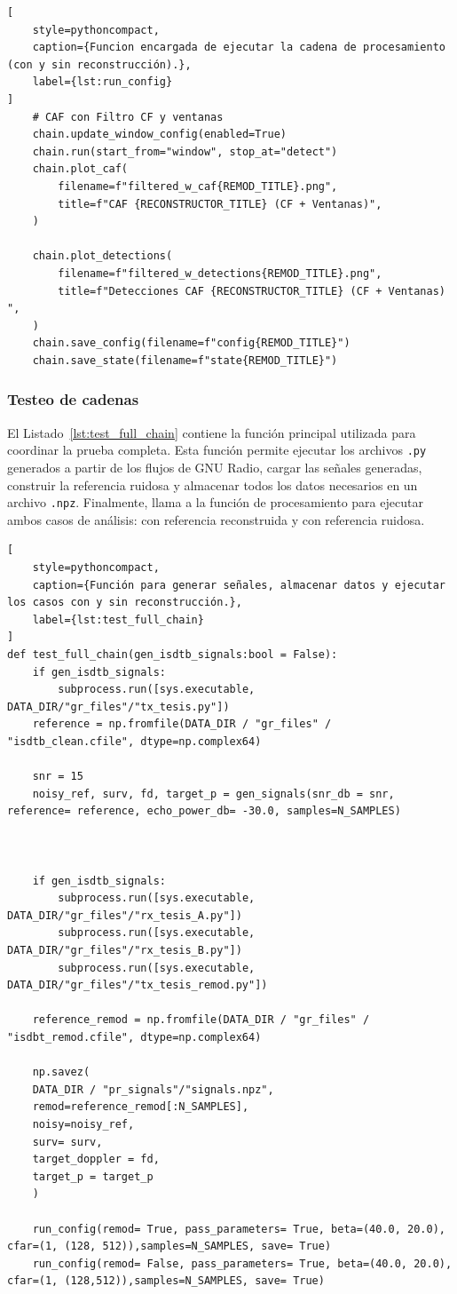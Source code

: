 \begin{lstlisting}[
    style=pythoncompact,
    caption={Funcion encargada de ejecutar la cadena de procesamiento (con y sin reconstrucción).},
    label={lst:run_config}
]
    # CAF con Filtro CF y ventanas
    chain.update_window_config(enabled=True)
    chain.run(start_from="window", stop_at="detect")
    chain.plot_caf(
        filename=f"filtered_w_caf{REMOD_TITLE}.png",
        title=f"CAF {RECONSTRUCTOR_TITLE} (CF + Ventanas)",
    )

    chain.plot_detections(
        filename=f"filtered_w_detections{REMOD_TITLE}.png",
        title=f"Detecciones CAF {RECONSTRUCTOR_TITLE} (CF + Ventanas) ",
    )
    chain.save_config(filename=f"config{REMOD_TITLE}")
    chain.save_state(filename=f"state{REMOD_TITLE}")

\end{lstlisting}
\newpage
\subsubsection{Testeo de cadenas}
El Listado~\ref{lst:test_full_chain} contiene la función principal utilizada para coordinar la prueba completa. Esta función permite ejecutar los archivos \texttt{.py} generados a partir de los flujos de GNU Radio, cargar las señales generadas, construir la referencia ruidosa y almacenar todos los datos necesarios en un archivo \texttt{.npz}. Finalmente, llama a la función de procesamiento para ejecutar ambos casos de análisis: con referencia reconstruida y con referencia ruidosa.\\\vspace{5pt}
\begin{lstlisting}[
    style=pythoncompact,
    caption={Función para generar señales, almacenar datos y ejecutar los casos con y sin reconstrucción.},
    label={lst:test_full_chain}
]
def test_full_chain(gen_isdtb_signals:bool = False):
    if gen_isdtb_signals:
        subprocess.run([sys.executable, DATA_DIR/"gr_files"/"tx_tesis.py"])
    reference = np.fromfile(DATA_DIR / "gr_files" / "isdtb_clean.cfile", dtype=np.complex64)

    snr = 15
    noisy_ref, surv, fd, target_p = gen_signals(snr_db = snr, reference= reference, echo_power_db= -30.0, samples=N_SAMPLES)
    

    
    if gen_isdtb_signals:
        subprocess.run([sys.executable, DATA_DIR/"gr_files"/"rx_tesis_A.py"])
        subprocess.run([sys.executable, DATA_DIR/"gr_files"/"rx_tesis_B.py"])
        subprocess.run([sys.executable, DATA_DIR/"gr_files"/"tx_tesis_remod.py"])
    
    reference_remod = np.fromfile(DATA_DIR / "gr_files" / "isdbt_remod.cfile", dtype=np.complex64)

    np.savez(
    DATA_DIR / "pr_signals"/"signals.npz",
    remod=reference_remod[:N_SAMPLES],
    noisy=noisy_ref,
    surv= surv,
    target_doppler = fd,
    target_p = target_p
    )
    
    run_config(remod= True, pass_parameters= True, beta=(40.0, 20.0), cfar=(1, (128, 512)),samples=N_SAMPLES, save= True)
    run_config(remod= False, pass_parameters= True, beta=(40.0, 20.0), cfar=(1, (128,512)),samples=N_SAMPLES, save= True)
\end{lstlisting}